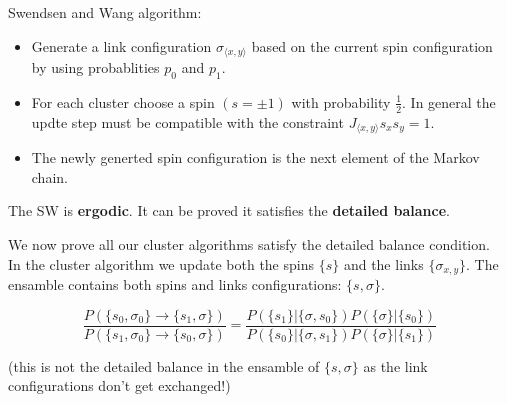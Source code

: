 \documentclass[12pt,handout]{beamer}
\begin{document}
\begin{frame}
\begin{center}
{\Large Swendsen and Wang algorithm:}

\begin{itemize}
\item Generate a link configuration $\sigma_{\langle x, y \rangle}$ based on the current spin configuration by using probablities $p_0$ and $p_1$. 
\item For each cluster choose a spin $\left( s = \pm 1 \right)$ with probability $\frac{1}{2}$. In general the updte step must be compatible with the constraint $J_{\langle x, y \rangle}  s_x s_y = 1$.
\item The newly generted spin configuration is the next element of the Markov chain.
\end{itemize}

\vspace{20pt}
The SW is \textbf{ergodic}. It can be proved it satisfies the \textbf{detailed balance}.

\end{center}
\end{frame}

\begin{frame}
\begin{center}
We now prove all our cluster algorithms satisfy the detailed balance condition.\\

In the cluster algorithm we update both the spins $\lbrace s \rbrace$ and the links $\lbrace \sigma_{x, y} \rbrace$. The ensamble contains both spins and links configurations: $\lbrace s,  \sigma \rbrace$.

\[
\frac{P \left( \lbrace s_0, \sigma_0 \rbrace \rightarrow \lbrace s_1, \sigma \rbrace \right)}{ P \left( \lbrace s_1, \sigma_0 \rbrace \rightarrow \lbrace s_0, \sigma \rbrace \right)} = \frac{P \left( \lbrace s_1 \rbrace | \lbrace \sigma, s_0 \rbrace \right) P \left( \lbrace \sigma \rbrace | \lbrace s_0 \rbrace \right) }{ P \left( \lbrace s_0 \rbrace | \lbrace \sigma, s_1 \rbrace \right) P \left( \lbrace \sigma \rbrace | \lbrace s_1 \rbrace \right) }
\]

(this is not the detailed balance in the ensamble of $\lbrace s,  \sigma \rbrace$ as the link configurations don't get exchanged!)


\end{center}
\end{frame}
\end{document}
